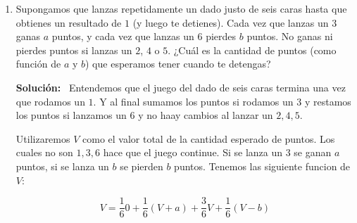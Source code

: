 \documentclass[11pt,letterpaper]{article}
\newenvironment{solution}{%
  \noindent\begin{shaded}
  \textbf{Solución:}\ }{
  \end{shaded}%
}
\newcommand{\bvec}[1]{\symbfit{#1}}
\begin{document}
\begin{enumerate}
\begin{solution}
 \[\\
  \begin{aligned}\\\\\\\\
  2,5:
    f(\bvec{x}) &= \min_{s\in[-1,1]} s(2+5) = -7 \\
    g(\bvec{x}) &= \min_{s_i\in[-1,1]} (s_1*2) + \min_{s_i\in[-1,1]} (s_2*5) = -7\\ -2,-5:
    f(\bvec{x}) &= \min_{s\in[-1,1]} s((-2)+(-5)) = -7 \\
    g(\bvec{x}) &= \min_{s_i\in[-1,1]} (s_1(-2)) + \min_{s_i\in[-1,1]} (s_2(-5)) = -7\\-2,5:
    f(\bvec{x}) &= \min_{s\in[-1,1]} s((-2)+5) = -3 \\
    g(\bvec{x}) &= \min_{s_i\in[-1,1]} (s_1(-2)) + \min_{s_i\in[-1,1]} (s_2*5) = -7
  \end{aligned}
  \]
Como podemos notar:  
  \[
  \begin{aligned}
    f(\bvec{x}) &\geq g(\bvec{x})
  \end{aligned}
  \]
Esto es porque al minimizar cada termino y luego sumar com \(g(x)\), no puede dar un resultado mayor a comparacion de sumar todos los terminos y luego tomar el minimo. \(g(x)\) Es el minimo mas posible a comparacion con\(f(x)\).
  \end{solution} 
\item%
  Supongamos que lanzas repetidamente un dado justo de seis caras
  hasta que obtienes un resultado de \(1\) (y luego te detienes).
  Cada vez que lanzas un \(3\) ganas \(a\) puntos, y cada vez que
  lanzas un \(6\) pierdes \(b\) puntos.  No ganas ni pierdes puntos si
  lanzas un \(2\), \(4\) o \(5\).  ¿Cuál es la cantidad de puntos
  (como función de \(a\) y \(b\)) que esperamos tener cuando te
  detengas?
  \begin{solution}
    Entendemos que el juego del dado de seis caras termina una vez que rodamos un \(1\). Y al final sumamos los puntos si rodamos un \(3\) y restamos los puntos si lanzamos un \(6\) y no haay cambios al lanzar un \(2,4,5\).

Utilizaremos \(V\) como el valor total de la cantidad esperado de puntos. Los cuales no son \(1,3,6\) hace que el juego continue. Si se lanza un \(3\) se ganan \(a\) puntos, si se lanza un \(b\) se pierden \(b\) puntos. Tenemos las siguiente funcion de \(V\):

\[V = \frac{1}{6}0 + \frac{1}{6}(V+a) + \frac{3}{6}V + \frac{1}{6}(V-b)\]


\end{solution}
\end{enumerate}
\end{document}
